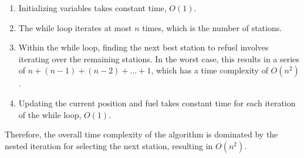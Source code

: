 \begin{parts}
\begin{solution}
        \begin{enumerate}
            \item Initializing variables takes constant time, $O(1)$.
            \item The while loop iterates at most $n$ times, which is the number of stations.
            \item Within the while loop, finding the next best station to refuel involves iterating over the remaining stations. In the worst case, this results in a series of $n + (n-1) + (n-2) + \ldots + 1$, which has a time complexity of $O(n^2)$.
            \item Updating the current position and fuel takes constant time for each iteration of the while loop, $O(1)$.
        \end{enumerate}

        Therefore, the overall time complexity of the algorithm is dominated by the nested iteration for selecting the next station, resulting in $O(n^2)$. 
    \end{solution}
\end{parts}
